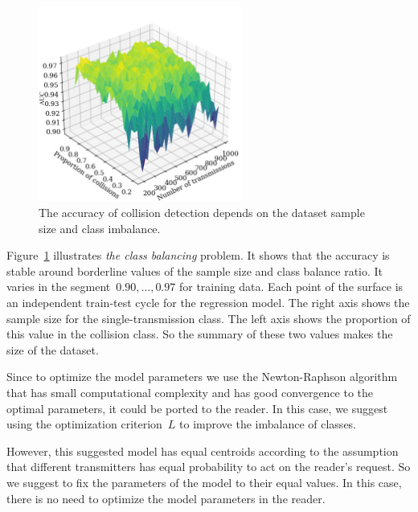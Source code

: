 \documentclass[12pt]{article}
\begin{document}
\begin{figure}[!htbp]
\centering
\includegraphics[width=0.6\textwidth]{fig_sampe_size_mean2}
\caption{The accuracy of collision detection depends on the dataset sample size and class imbalance.}
\label{fig:samle_size}
\end{figure}

Figure~\ref{fig:samle_size} illustrates \emph{the class balancing} problem. It shows that the accuracy is stable around borderline values of the sample size and class balance ratio. It varies in the segment~$0.90,\ldots,0.97$ for training data. Each point of the surface is an independent train-test cycle for the regression model. The right axis shows the sample size for the single-transmission class. The left axis shows the proportion of this value in the collision class. So the summary of these two values makes the size of the dataset. 

Since to optimize the model parameters we use the Newton-Raphson algorithm~\cite{Motrenko2014} that has small computational complexity and has good convergence to the optimal parameters, it could be ported to the reader. In this case, we suggest using the optimization criterion~$L$ to improve the imbalance of classes.  

However, this suggested model has equal centroids according to the assumption that different transmitters has equal probability to act on the reader's request. So we suggest to fix the parameters of the model to their equal values. In this case, there is no need to optimize the model parameters in the reader. 
\end{document}
